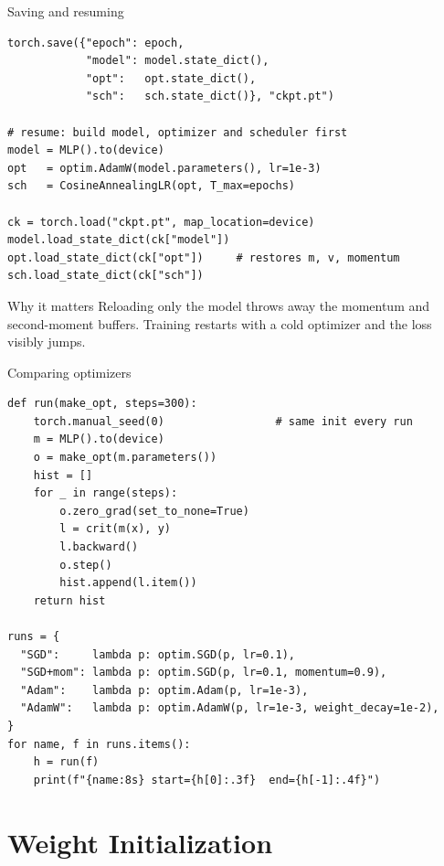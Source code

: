 \documentclass[10pt,aspectratio=169]{beamer}
\begin{document}
\begin{frame}[fragile]{Saving and resuming}
\begin{lstlisting}
torch.save({"epoch": epoch,
            "model": model.state_dict(),
            "opt":   opt.state_dict(),
            "sch":   sch.state_dict()}, "ckpt.pt")

# resume: build model, optimizer and scheduler first
model = MLP().to(device)
opt   = optim.AdamW(model.parameters(), lr=1e-3)
sch   = CosineAnnealingLR(opt, T_max=epochs)

ck = torch.load("ckpt.pt", map_location=device)
model.load_state_dict(ck["model"])
opt.load_state_dict(ck["opt"])     # restores m, v, momentum
sch.load_state_dict(ck["sch"])
\end{lstlisting}
\begin{block}{Why it matters}
Reloading only the model throws away the momentum and second-moment buffers. Training
restarts with a cold optimizer and the loss visibly jumps.
\end{block}
\end{frame}

\begin{frame}[fragile]{Comparing optimizers}
\begin{lstlisting}[basicstyle=\ttfamily\scriptsize]
def run(make_opt, steps=300):
    torch.manual_seed(0)                 # same init every run
    m = MLP().to(device)
    o = make_opt(m.parameters())
    hist = []
    for _ in range(steps):
        o.zero_grad(set_to_none=True)
        l = crit(m(x), y)
        l.backward()
        o.step()
        hist.append(l.item())
    return hist

runs = {
  "SGD":     lambda p: optim.SGD(p, lr=0.1),
  "SGD+mom": lambda p: optim.SGD(p, lr=0.1, momentum=0.9),
  "Adam":    lambda p: optim.Adam(p, lr=1e-3),
  "AdamW":   lambda p: optim.AdamW(p, lr=1e-3, weight_decay=1e-2),
}
for name, f in runs.items():
    h = run(f)
    print(f"{name:8s} start={h[0]:.3f}  end={h[-1]:.4f}")
\end{lstlisting}
\end{frame}

\section{Weight Initialization}
\end{document}
